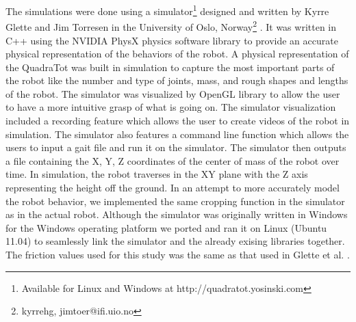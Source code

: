 The simulations were done using a simulator\footnote{Available for Linux and Windows at http://quadratot.yosinski.com} designed and written by Kyrre Glette and Jim Torresen in the University of Oslo, Norway\footnote{{kyrrehg, jimtoer}@ifi.uio.no} \cite{glette}. 
It was written in C++ using the NVIDIA PhysX physics software library to provide an accurate physical representation of the behaviors of the robot. 
A physical representation of the QuadraTot was built in simulation to capture the most important parts of the robot like the number and type of joints, mass, and rough shapes and lengths of the robot. 
The simulator was visualized by OpenGL library to allow the user to have a more intuitive grasp of what is going on. 
The simulator visualization included a recording feature which allows the user to create videos of the robot in simulation.
The simulator also features a command line function which allows the users to input a gait file and run it on the simulator. 
The simulator then outputs a file containing the X, Y, Z coordinates of the center of mass of the robot over time. 
In simulation, the robot traverses in the XY plane with the Z axis representing the height off the ground. 
In an attempt to more accurately model the robot behavior, we implemented the same cropping function in the simulator as in the actual robot. 
Although the simulator was originally written in Windows for the Windows operating platform we ported and ran it on Linux (Ubuntu 11.04) to seamlessly link the simulator and the already exising libraries together. 
The friction values used for this study was the same as that used in Glette et al. \cite{glette}. 
%
%

